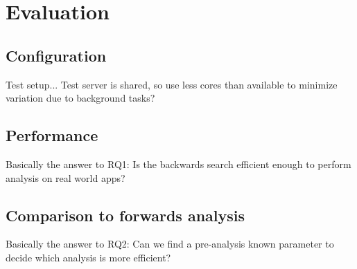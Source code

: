 \documentclass[../draft.tex]{subfiles}
\begin{document}
    \chapter{Evaluation}

    \section{Configuration}
    Test setup...
    Test server is shared, so use less cores than available to minimize variation due to background tasks?

    \section{Performance}
    Basically the answer to RQ1: Is the backwards search efficient enough to perform analysis on real world apps?

    \section{Comparison to forwards analysis}
    Basically the answer to RQ2: Can we find a pre-analysis known parameter to decide which analysis is more efficient?
\end{document}
